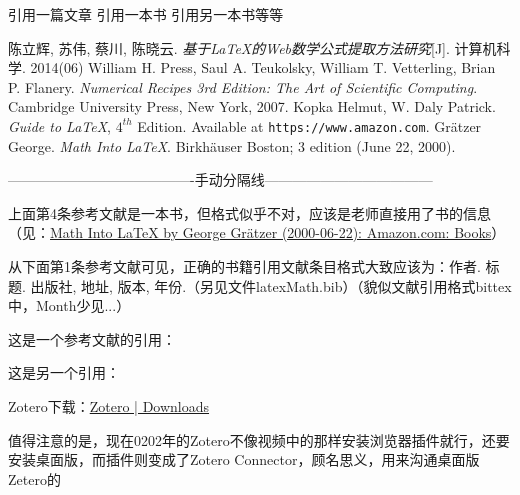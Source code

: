 \documentclass{ctexart}
\begin{document}

    引用一篇文章\cite{article1} 引用一本书\cite{book1} 引用另一本书\cite{latexGuide}等等
    \begin{thebibliography}{99}
        陈立辉, 苏伟, 蔡川, 陈晓云. \emph{基于\LaTeX 的Web数学公式提取方法研究}[J]. 计算机科学. 2014(06)
        William H. Press, Saul A. Teukolsky, William T. Vetterling, Brian P. Flanery. \emph{Numerical Recipes 3rd Edition: The Art of Scientific Computing}. Cambridge University Press, New York, 2007.
        Kopka Helmut, W. Daly Patrick. \emph{Guide to \LaTeX}, $4^{th}$ Edition. Available at \texttt{https://www.amazon.com}.
        Grätzer George. \emph{Math Into \LaTeX}. Birkhäuser Boston; 3 edition (June 22, 2000).
    \end{thebibliography}

    ----------------------------------------手动分隔线------------------------------------

    上面第4条参考文献是一本书，但格式似乎不对，应该是老师直接用了书的信息（见：\href{https://www.amazon.com/Math-LaTeX-George-Gr%C3%A4tzer-2000-06-22/dp/B017YC6E06}{Math Into LaTeX by George Grätzer (2000-06-22): Amazon.com: Books}）
    
    从下面第1条参考文献\cite{latexMath2}可见，正确的书籍引用文献条目格式大致应该为：作者. 标题. 出版社, 地址, 版本, 年份.（另见文件latexMath.bib）（貌似文献引用格式bittex中，Month少见...）

    这是一个参考文献的引用：\cite{mittelbach2004}  %

    这是另一个引用：\cite{patashnik1988designing}

    \nocite{*}  %
    

    Zotero下载：\href{https://www.zotero.org/download/}{Zotero | Downloads}

    值得注意的是，现在0202年的Zotero不像视频中的那样安装浏览器插件就行，还要安装桌面版，而插件则变成了Zotero Connector，顾名思义，用来沟通桌面版Zetero的
\end{document}
